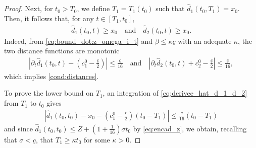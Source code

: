 \documentclass[reqno,10pt]{amsart}
\numberwithin{equation}{section}
\begin{document}
\begin{proof}
Next, for $t_0 > T_0$, we define $ T_1 =T_1(t_0)$ such that $\hat{d}_1(t_0,T_1) =x_0$. Then, it follows that, for any $t \in [T_1,t_0]$,
 \begin{align}\label{cond:distances}
     \hat{d}_1(t_0,t)  \ge x_0 \quad \text{and} \quad \hat{d}_2(t_0,t) \ge x_0.
 \end{align}
 Indeed, from \eqref{eq:bound_dot:z_omega_i_t} and $\beta \leq \kappa \underline{c}$ with an adequate $\kappa$, the two distance functions are monotonic
 \begin{align}\label{eq:derivee_hat_d_1_d_2}
     \left\vert \partial_t \hat{d}_1(t_0,t) - \left( c_1^0  - \frac{\underline{c}}{2} \right) \right\vert \leq \frac{\underline{c}}{16} \quad \text{and} \quad \left\vert  \partial_t \hat{d}_2(t_0,t) + c_2^0 - \frac{\underline{c}}{2} \right\vert \leq \frac{\underline{c}}{16},
 \end{align}
 which implies \eqref{cond:distances}.

 To prove the lower bound on $T_1$, an integration of \eqref{eq:derivee_hat_d_1_d_2} from $T_1$ to $t_0$ gives
 \begin{align*}
     \left\vert \hat{d}_1(t_0,t_0) - x_0 - \left( c_1^0 - \frac{\underline{c}}{2}\right) (t_0-T_1) \right\vert \leq \frac{\underline{c}}{16} (t_0-T_1)
 \end{align*}
 and since $\hat{d}_1(t_0,t_0) \leq Z + (1+\frac{1}{16}) \sigma t_0$ by \eqref{eq:encad_z}, we obtain, recalling that $\sigma<\underline{c}$, that $T_1 \geq \kappa t_0$ for some $\kappa>0$.
 



\end{proof}
\end{document}
